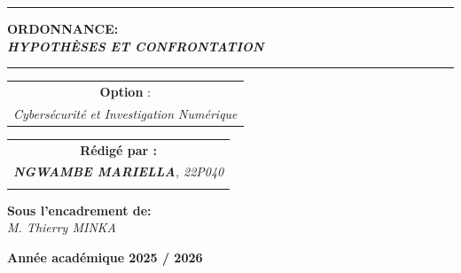 \documentclass[memoire, 12pt]{report}
\begin{document}
\begin{titlepage}
\begin{center}
		\vspace{0.5cm}
		\begin{tabular}{l*{40}{@{\hskip 3.5cm}c@{\hskip5cm}} p{3.5cm} r}
		\end{tabular}
		
		\noindent\rule{\textwidth}{0.7mm}
		\Large{{\textbf{ORDONNANCE:}}}\\
		\Large{{\textbf{\textit{HYPOTHÈSES ET CONFRONTATION}}}}
		\noindent\rule{\textwidth}{0.7mm}
	\end{center}
		
	\begin{center}
	\begin{tabular}{c}
		
		\vspace{0.1cm}
		\normalsize
	
	
		\vspace{0.1cm}
		\normalsize\textbf{Option }:\\			
		\textsl{Cybersécurité et Investigation Numérique}
		
	\end{tabular}
	\end{center}
		
	\begin{center}
		\normalsize %
		\begin{tabular}{c}
			\vspace{0.07cm}
			\hspace{0.02cm} \textbf{\textbf{Rédigé par :}}\\
			\hspace{0.02cm} \textsl{\textbf{NGWAMBE  MARIELLA}, 22P040}\\\\
			
		\end{tabular}
	\end{center}
	
	\begin{center}
	\hspace{0.02cm} \textbf{Sous l'encadrement de:}\\
	\hspace{0.02cm} \textsl{M. Thierry MINKA}
	\end{center}
	
    
	\vspace{2cm}
	\begin{center}
		\textbf{Année académique 2025 / 2026}
	\end{center}
		
	\vspace{-1.4cm}
	
		
	\vfill%
	
\end{titlepage}
\tableofcontents
\newpage
\end{document}
